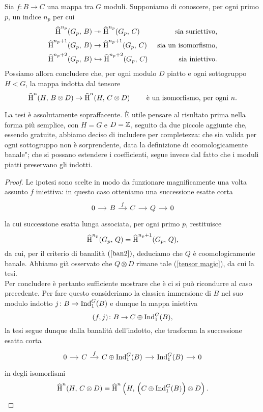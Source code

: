 \begin{proposition}
	Sia $ f \colon B \to C $ una mappa tra $ G $ moduli. Supponiamo di conoscere, per ogni primo $ p $, un indice $ n_p $ per cui
	\begin{align*}
		\operatorname{\widehat{H}}^{n_p}(G_p,\, B) &\twoheadrightarrow \operatorname{\widehat{H}}^{n_p}(G_p,\, C) & \text{ sia suriettivo,} \\
		\operatorname{\widehat{H}}^{n_p+1}(G_p,\, B) &\to \operatorname{\widehat{H}}^{n_p+1}(G_p,\, C) & \text{ sia un isomorfismo,} \\
		\operatorname{\widehat{H}}^{n_p+2}(G_p,\, B) &\hookrightarrow \operatorname{\widehat{H}}^{n_p+2}(G_p,\, C) & \text{ sia iniettivo.}
	\end{align*}
	Possiamo allora concludere che, per ogni modulo $ D $ piatto e ogni sottogruppo $ H < G $, la mappa indotta dal tensore
	\[ \operatorname{\widehat{H}}^n(H, \, B \otimes D) \to \operatorname{\widehat{H}}^n(H, \, C \otimes D) \qquad\text{ è un isomorfismo, per ogni } n. \]
\end{proposition}

La tesi è assolutamente sopraffacente. È utile pensare al risultato prima nella forma più semplice, con $ H=G $ e $ D = \mathbb{Z} $, seguito da due piccole aggiunte che, essendo gratuite, abbiamo deciso di includere per completezza: che sia valida per ogni sottogruppo non è sorprendente, data la definizione di \leftquote coomologicamente banale"; che si possano estendere i coefficienti, segue invece dal fatto che i moduli piatti preservano gli indotti. 

\begin{proof}
	Le ipotesi sono scelte in modo da funzionare magnificamente una volta assunto $ f $ iniettiva: in questo caso otteniamo una successione esatte corta
	\[ \begin{tikzcd}[column sep = small]
	0 \rar
	& B \rar["f"]
	& C \rar
	& Q \rar
	& 0 \end{tikzcd} \]
	la cui successione esatta lunga associata, per ogni primo $ p $, restituisce
	\[ \operatorname{\widehat{H}}^{n_p}(G_p, \, Q) = \operatorname{\widehat{H}}^{n_p+1}(G_p, \, Q), \]
	da cui, per il criterio di banalità $ (\ref{ban2}) $, deduciamo che $ Q $ è coomologicamente banale. Abbiamo già osservato che $ Q \otimes D $ rimane tale (\ref{tensor magic}), da cui la tesi. \\
	
	Per concludere è pertanto sufficiente mostrare che è ci si può ricondurre al caso precedente. Per fare questo consideriamo la classica immersione di $ B $ nel suo modulo indotto $ j \colon B \to \operatorname{Ind}_1^G(B) $ e dunque la mappa iniettiva
	\[ (f, j)\colon B \to C \oplus \operatorname{Ind}_1^G(B), \]
	la tesi segue dunque dalla banalità dell'indotto, che trasforma la successione esatta corta
	\[ \begin{tikzcd}[column sep = small]
	0 \rar
	& C \rar["f"]
	& C \oplus \Ind_1^G(B) \rar
	& \Ind_1^G(B) \rar
	& 0 \end{tikzcd} \]
	in degli isomorfismi
	\[ \operatorname{\widehat{H}}^n(H, \, C \otimes D ) = \operatorname{\widehat{H}}^n \left(H, \, \left(C \oplus \operatorname{Ind}_1^G(B)\right) \otimes D \right). \]
\end{proof}

